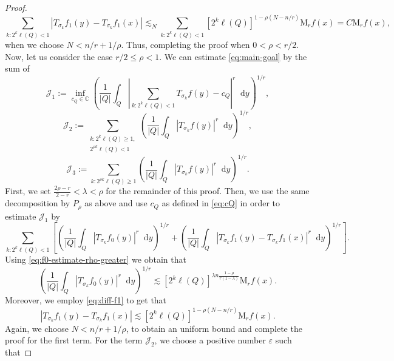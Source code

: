 \documentclass[12pt, reqno]{amsart}
\theoremstyle{definition}
\theoremstyle{remark}
\numberwithin{equation}{section}
\newcommand*\diff{\mathop{}\!\mathrm{d}}
\begin{document}
\begin{proof}
\begin{equation*}
        \sum_{k:2^k\ell(Q)<1}|T_{\sigma_k} f_1(y) - T_{\sigma_k} f_1(x)| \lesssim_N\sum_{k:2^k\ell(Q)<1} [2^k\ell(Q)]^{1-\rho(N-n/r)}\mathrm{M}_r f(x) = C\mathrm{M}_rf(x),
    \end{equation*}
    when we choose $N<n/r + 1/\rho$. Thus, completing the proof when $0<\rho<r/2 $. Now, let us consider the case $r/2\leq \rho<1$. We can estimate \cref{eq:main-goal} by the sum of 
    \begin{equation*}
        \mathcal{J}_1 := \inf_{c_Q \in \mathbb{C}} \left( \frac{1}{|Q|}\int_Q \left| \sum_{k:2^k\ell(Q)<1} T_{\sigma_k} f(y) - c_Q \right|^r \diff y
         \right)^{1/r},
    \end{equation*}
    \begin{equation*}
        \mathcal{J}_2 := \sum_{\substack{k:2^k\ell(Q)\geq 1, \\ 2^{\rho k}\ell(Q) <1}} \left(\frac{1}{|Q|} \int_Q |T_{\sigma_k}f(y)|^r \diff y 
        \right)^{1/r},
    \end{equation*}
    \begin{equation*}
        \mathcal{J}_3 := \sum_{k:2^{\rho k} \ell(Q) \geq 1} \left( \frac{1}{|Q|} \int_Q |T_{\sigma_k}f(y)|^r \diff y 
        \right)^{1/r}.
    \end{equation*}
    First, we set $\frac{2\rho - r}{2-r} < \lambda < \rho$ for the remainder of this proof. Then, we use the same decomposition by $P_\rho$ as above and use $c_Q$ as defined in \cref{eq:cQ} in order to estimate $\mathcal{J}_1$ by
    \begin{equation*}
        \sum_{k:2^k\ell(Q)<1} \left[
        \left(  \frac{1}{|Q|} \int_Q |T_{\sigma_k} f_0 (y)|^r \diff y
        \right)^{1/r} + \left( \frac{1}{|Q|}\int_Q|T_{\sigma_k} f_1(y) -T_{\sigma_k}f_1(x)|^r \diff y
        \right)^{1/r}
        \right].
    \end{equation*}
    Using \cref{eq:f0-estimate-rho-greater} we obtain that 
    \begin{equation*}
        \left( 
        \frac{1}{|Q|} \int_Q |T_{\sigma_k} f_0 (y)|^r \diff y
        \right)^{1/r} \lesssim [2^k\ell(Q)]^{\lambda n \frac{1-\rho}{r(1-\lambda)}} \mathrm{M}_rf(x).
    \end{equation*}
    Moreover, we employ \cref{eq:diff-f1} to get that
    \begin{equation*}
        |T_{\sigma_k} f_1(y) - T_{\sigma_k} f_1(x)| \lesssim [2^k\ell(Q)]^{1-\rho(N-n/r)} \mathrm{M}_rf(x).
    \end{equation*}
    Again, we choose $N < n/r + 1/\rho$, to obtain an uniform bound and complete the proof for the first term. For the term $\mathcal{J}_2$, we choose a positive number $\varepsilon$ such that 

\end{proof}
\end{document}

